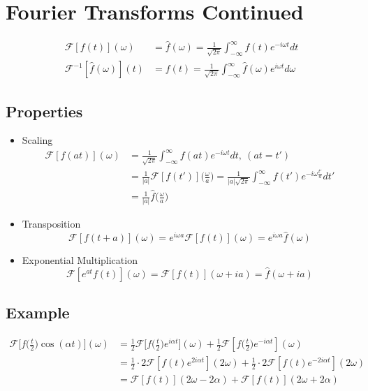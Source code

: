 \documentclass[a4paper, 11pt, normalem]{report}
\newcommand\ifnt{\int_{-\infty}^{\infty}}
\newcommand\F{\mathcal{F}}
\newcommand\om{\omega}
\begin{document}
\section{Fourier Transforms Continued}
\begin{align*}
    \F[f(t)](\om) &= \hat{f}(\om) = \frac{1}{\sqrt{2\pi}} \ifnt f(t)e^{-i\om t}dt \\
    \F^{-1}[\hat{f}(\om)](t) &= f(t) = \frac{1}{\sqrt{2\pi}} \ifnt \hat{f}(\om)e^{i\om t}d\om
\end{align*}

\subsection{Properties}
\begin{itemize}
    \item Scaling
            \begin{align*}
                \F[f(at)](\om) &= \frac{1}{\sqrt{2\pi}} \ifnt f(at)e^{-i\om t}dt, ~(at = t') \\
                &= \frac{1}{|a|} \F[f(t')]\Big(\frac{\om}{a}\Big) = \frac{1}{|a|\sqrt{2\pi}} \ifnt f(t') e^{-i\om \tfrac{t'}{a}}dt' \\
                &= \frac{1}{|a|} \hat{f}\Big(\frac{\om}{a}\Big)
            \end{align*}
    \item Transposition
            \begin{equation*}
                \F[f(t + a)](\om) = e^{i\om a} \F[f(t)](\om) = e^{i\om a}\hat{f}(\om)
            \end{equation*}
    \item Exponential Multiplication
            \begin{equation*}
                \F[e^{at}f(t)](\om) = \F[f(t)](\om + ia) = \hat{f}(\om + ia)
            \end{equation*}
\end{itemize}
\subsection{Example}
\begin{align*}
    \F\Big[f\big(\frac{t}{2}\big)\cos(\alpha t)\Big](\om) &= \frac{1}{2}\F\Big[f\big(\frac{t}{2}\big)e^{i\alpha t}\Big](\om) + \frac{1}{2}\F[f\big(\frac{t}{2}\big)e^{-i\alpha t}](\om) \\
    &= \frac{1}{2}\cdot2 \F[f(t)e^{2i\alpha t}](2\om) + \frac{1}{2}\cdot2 \F[f(t)e^{-2i\alpha t}](2\om) \\
    &= \F[f(t)](2\om - 2\alpha) + \F[f(t)](2\om + 2\alpha)
\end{align*}
\end{document}
